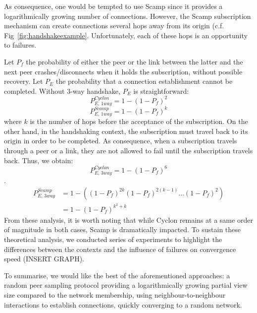 As consequence, one would be tempted to use Scamp since it provides a
logarithmically growing number of connections. However, the Scamp subscription
mechanism can create connections several hops away from its origin
(c.f. Fig~\ref{fig:handshakeexample}. Unfortunately, each of these hops is an
opportunity to failures.

Let $P_f$ the probability of either the peer or the link between the latter and
the next peer crashes/disconnects when it holds the subscription, without
possible recovery. Let $P_E$ the probability that a connection establishment
cannot be completed. Without 3-way handshake, $P_E$ is straightforward:
\begin{equation} P_{E,\,1way}^{Cyclon}=1-(1- P_f)^2 \end{equation}
\begin{equation} P_{E,\,1way}^{Scamp}=1-(1- P_f)^k \end{equation} where $k$ is
the number of hops before the acceptance of the subscription. On the other
hand, in the handshaking context, the subscription must travel back to its
origin in order to be completed. As consequence, when a subscription travels
through a peer or a link, they are not allowed to fail until the subscription
travels back. Thus, we obtain:
\begin{equation} P_{E,\,3way}^{Cyclon}=1-(1- P_f)^6\end{equation}.
\begin{align} P_{E,\,3way}^{Scamp} &=1 - ((1-P_f)^{2k} (1-P_f)^{2(k-1)}
                                     \ldots (1-P_f)^2) \\
                                   &=1-(1-P_f)^{k^2+k}
\end{align}
From these analysis, it is worth noting that while Cyclon remains at a same
order of magnitude in both cases, Scamp is dramatically impacted. To sustain
these theoretical analysis, we conducted series of experiments to highlight the
differences between the contexts and the influence of failures on convergence
speed (INSERT GRAPH).

To summarise, we would like the best of the aforementioned approaches: a random
peer sampling protocol providing a logarithmically growing partial view size
compared to the network membership, using neighbour-to-neighbour interactions
to establish connections, quickly converging to a random network.

